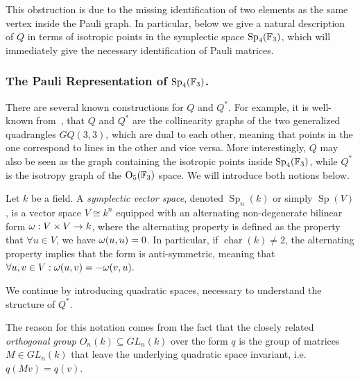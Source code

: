 This obstruction is due to the missing identification
of two elements as the same vertex inside the Pauli graph.
In particular, below we give a natural description of $Q$ in terms
of isotropic points in the symplectic space $\operatorname{Sp}_4(\mathbb{F}_3)$,
which will immediately give the necessary identification of Pauli matrices.

\subsubsection{The Pauli Representation of $\operatorname{Sp}_4(\mathbb{F}_3)$.}
There are several known constructions for $Q$ and $Q^*$.
For example, it is well-known from~\cite{Brouwer_Van_Maldeghem_2022},
that $Q$ and $Q^*$ are the collinearity graphs of the two 
generalized quadrangles $GQ(3, 3)$, which are dual to each other,
meaning that points in the one correspond to lines in the other and vice versa.
%
More interestingly, $Q$ may also be seen as the graph containing the isotropic 
points inside $\operatorname{Sp}_4(\mathbb{F}_3)$, while $Q^*$ is the isotropy graph 
of the $\operatorname{O}_5(\mathbb{F}_3)$ space. We will introduce both notions below.
\begin{definition}
    Let $k$ be a field. A \emph{symplectic vector space}, denoted $\operatorname{Sp}_n(k)$
    or simply $\operatorname{Sp}(V)$, is a vector space $V \cong k^n$ equipped
    with an alternating non-degenerate bilinear form $\omega: V \times V \rightarrow k$,
    where the alternating property is defined as the 
    property that $\forall u \in V$, we have $\omega(u, u) = 0$.
    In particular, if $\operatorname{char}(k) \neq 2$, the alternating property
    implies that the form is anti-symmetric, meaning that 
    $\forall u,v \in V:\omega(u,v) = -\omega(v, u).$
\end{definition}
We continue by introducing quadratic spaces,
necessary to understand the structure of $Q^*$.
The reason for this notation comes from the fact that
the closely related \emph{orthogonal group}
$O_n(k) \subseteq GL_n(k)$ over the form $q$
is the group of matrices $M \in GL_n(k)$
that leave the underlying quadratic space invariant, i.e. $q(Mv) = q(v)$.

